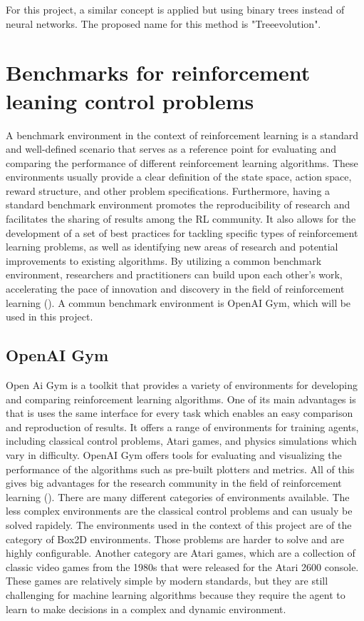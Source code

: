 For this project, a similar concept is applied but using binary trees instead of neural networks. The proposed name for this method is "Treeevolution".


\section{Benchmarks for reinforcement leaning control problems}

A benchmark environment in the context of reinforcement learning is a standard and well-defined scenario that serves as a reference point for evaluating and comparing the performance of different reinforcement learning algorithms. These environments usually provide a clear definition of the state space, action space, reward structure, and other problem specifications.
Furthermore, having a standard benchmark environment promotes the reproducibility of research and facilitates the sharing of results among the RL community. It also allows for the development of a set of best practices for tackling specific types of reinforcement learning problems, as well as identifying new areas of research and potential improvements to existing algorithms. By utilizing a common benchmark environment, researchers and practitioners can build upon each other's work, accelerating the pace of innovation and discovery in the field of reinforcement learning (\cite{sutton_reinforcement_2018}). A commun benchmark environment is OpenAI Gym, which will be used in this project.

\subsection{OpenAI Gym}

Open Ai Gym is a toolkit that provides a variety of environments for developing and comparing reinforcement learning algorithms. One of its main advantages is that is uses the same interface for every task which enables an easy comparison and reproduction of results. It offers a range of environments for training agents, including classical control problems, Atari games, and physics simulations which vary in difficulty. OpenAI Gym offers tools for evaluating and visualizing the performance of the algorithms such as pre-built plotters and metrics. All of this gives big advantages for the research community in the field of reinforcement learning (\cite{noauthor_openai_2016}). There are many different categories of environments available. The less complex environments are the classical control problems and can usualy be solved rapidely. The environments used in the context of this project are of the category of Box2D environments. Those problems are harder to solve and are highly configurable. Another category are Atari games, which are a collection of classic video games from the 1980s that were released for the Atari 2600 console. These games are relatively simple by modern standards, but they are still challenging for machine learning algorithms because they require the agent to learn to make decisions in a complex and dynamic environment.

